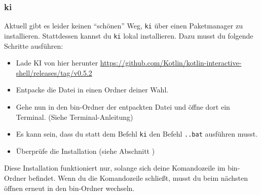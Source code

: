 \subsubsection{ki}
Aktuell gibt es leider keinen \enquote{schönen} Weg, \texttt{ki} über einen Paketmanager zu installieren. Stattdessen kannst du \texttt{ki} lokal installieren. Dazu musst du folgende Schritte ausführen:
\begin{itemize}
    \item Lade KI von hier herunter \url{https://github.com/Kotlin/kotlin-interactive-shell/releases/tag/v0.5.2}
    \item Entpacke die Datei in einen Ordner deiner Wahl.
    \item Gehe nun in den bin-Ordner der entpackten Datei und öffne dort ein Terminal. (Siehe Terminal-Anleitung)
    \item Es kann sein, dass du statt dem Befehl \texttt{ki} den Befehl \texttt{.\ki.bat} ausführen musst.
    \item Überprüfe die Installation (siehe Abschnitt )
\end{itemize}
\begin{hinweis}
    Diese Installation funktioniert nur, solange sich deine Komandozeile im bin-Ordner befindet. Wenn du die Komandozeile schließt, musst du beim nächsten öffnen erneut in den bin-Ordner wechseln.
\end{hinweis}


